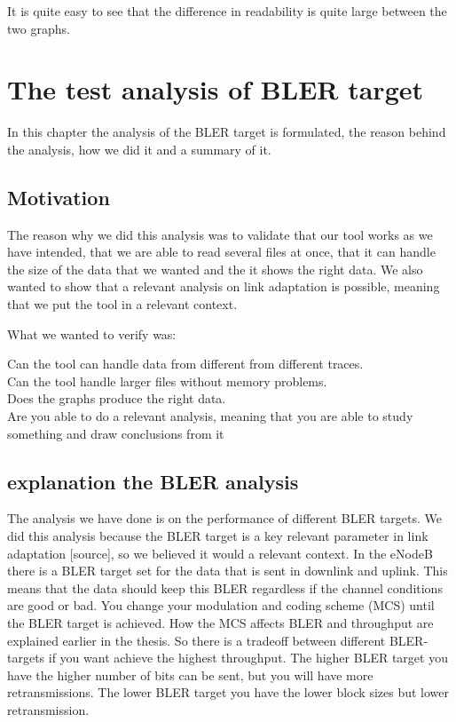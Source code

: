 \documentclass[cropmarks, frame, english]{idamasterthesis}
\begin{document}
It is quite easy to see that the difference in readability is quite large between the two graphs.


























\chapter{The test analysis of BLER target} %
In this chapter the analysis of the BLER target is formulated, the reason behind the analysis, how we did it and a summary of it.

\section{Motivation}
The reason why we did this analysis was to validate that our tool works as we have intended, that we are able to read several files at once, that it can handle the size of the data that we wanted and the it shows the right data. We also wanted to show that a relevant analysis on link adaptation is possible, meaning that we put the tool in a relevant context.

What we wanted to verify was:

Can the tool can handle data from different from different traces.\\
Can the tool handle larger files without memory problems. \\
Does the graphs produce the right data. \\
Are you able to do a relevant analysis, meaning that you are able to study something and draw conclusions from it \\





\section{explanation the BLER analysis}
The analysis we have done is on the performance of different BLER targets. We did this analysis because the BLER target is a key relevant parameter in link adaptation [source], so we believed it would a relevant context. In the eNodeB there is a BLER target set for the data that is sent in downlink and uplink. This means that the data should keep this BLER regardless if the channel conditions are good or bad. You change your modulation and coding scheme (MCS) until the BLER target is achieved. How the MCS affects BLER and throughput are explained earlier in the thesis. So there is a tradeoff between different BLER-targets if you want achieve the highest throughput. The higher BLER target you have the higher number of bits can be sent, but you will have more retransmissions. The lower BLER target you have the lower block sizes but lower retransmission.
\end{document}
